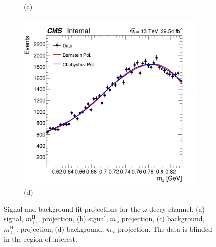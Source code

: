 \begin{figure}[!ht]
\begin{subfigure}[t]{0.50\mylength}
        \vspace*{-0.2cm}
        \caption{\footnotesize (c)}
    \end{subfigure}%
    \begin{subfigure}[t]{0.50\mylength}
        \centering
        \includegraphics[width=0.49\mylength]{resources/plots/Omega_fit_BKG_MM.png}
        \vspace*{-0.2cm}
        \caption{\footnotesize (d)}
    \end{subfigure}%
\caption{Signal and background fit projections for the $\omega$ decay channel. (a) signal, $m^{\text{H}}_{\gamma, \omega}$ projection, (b) signal, $m_{\omega}$ projection, (c) background, $m^{\text{H}}_{\gamma, \omega}$ projection, (d) background, $m_{\omega}$ projection. The data is blinded in the region of interest.}
\label{fig:sig_bkg_modelling_omega}
    \vspace*{-0.0cm}
\end{figure}

\newpage

